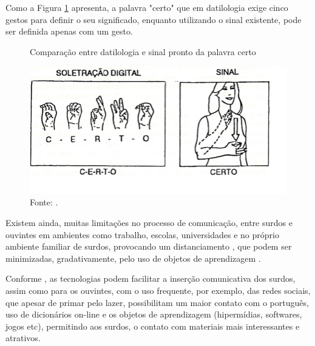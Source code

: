 Como a Figura \ref{fig:CERTO} apresenta, a palavra "certo" que em datilologia exige cinco gestos para definir o  seu significado, 
enquanto utilizando o sinal existente, pode ser definida apenas com um gesto.
\begin{figure}[H]
	\vspace{4mm}
	\centering
	\caption{Comparação entre datilologia e sinal pronto da palavra certo}
	\label{fig:CERTO}
	\includegraphics[scale=0.4, trim={0 1cm 2cm 0}, clip]{imagens/Certo}
	\caption*{Fonte: .}
\end{figure}

Existem ainda, muitas limitações no processo de comunicação, entre surdos e ouvintes em ambientes como
trabalho, escolas, universidades e no próprio ambiente familiar de surdos, provocando um distanciamento
\cite{jogoslibras}, que podem ser minimizadas, gradativamente, pelo
uso de objetos de aprendizagem \cite{ferramentas}.


Conforme , as tecnologias podem facilitar a inserção comunicativa dos surdos, assim como para os ouvintes, com o uso
frequente, por exemplo, das redes sociais, que apesar de primar pelo lazer, possibilitam um maior contato com o
português, uso de dicionários on-line e os objetos de aprendizagem (hipermídias, softwares, jogos etc), permitindo
aos surdos, o contato com materiais mais interessantes e atrativos.


